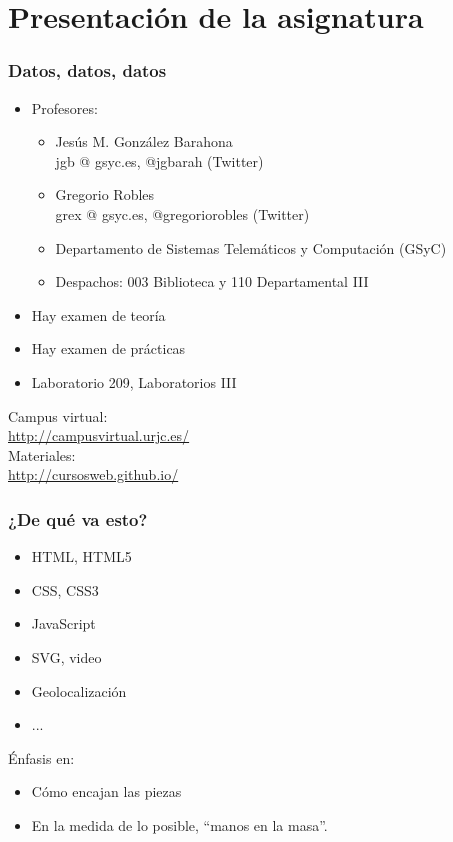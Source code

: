 %


\section{Presentación de la asignatura}


\begin{frame}
\frametitle{Datos, datos, datos}

\begin{itemize}
\item Profesores:
  \begin{itemize}
  \item Jesús M. González Barahona \\
    jgb @ gsyc.es, @jgbarah (Twitter)
  \item Gregorio Robles \\
    grex @ gsyc.es, @gregoriorobles (Twitter)
  \item Departamento de Sistemas Telemáticos y Computación (GSyC)
  \item Despachos: 003 Biblioteca y 110 Departamental III
  \end{itemize}
\item Hay examen de teoría
\item Hay examen de prácticas
\item Laboratorio 209, Laboratorios III
\end{itemize}

\begin{flushright}
Campus virtual: \\
{\small \url{http://campusvirtual.urjc.es/}} \\
Materiales: \\
{\small \url{http://cursosweb.github.io/}} \\
\end{flushright}

\end{frame}


\begin{frame}
\frametitle{¿De qué va esto?}


\begin{itemize}
\item HTML, HTML5
\item CSS, CSS3
\item JavaScript
\item SVG, video
\item Geolocalización
\item ...
\end{itemize}

Énfasis en:

\begin{itemize}
\item Cómo encajan las piezas
\item En la medida de lo posible, ``manos en la masa''.
\end{itemize}


\end{frame}


